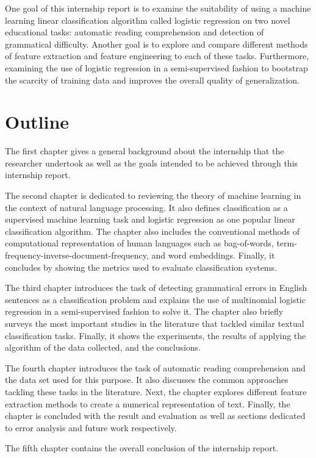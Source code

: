 One goal of this internship report is to examine the suitability of using a machine learning linear classification algorithm called logistic regression on two novel educational tasks: automatic reading comprehension and detection of grammatical difficulty. Another goal is to explore and compare different methods of feature extraction and feature engineering to each of these tasks. Furthermore, examining the use of logistic regression in a semi-supervised fashion to bootstrap the scarcity of training data and improves the overall quality of generalization. 


\section{Outline}
The first chapter gives a general background about the internship that the researcher undertook as well as the goals intended to be achieved through this internship report. 

The second chapter is dedicated to reviewing the theory of machine learning in the context of natural language processing. It also defines classification as a supervised machine learning task and logistic regression as one popular linear classification algorithm. The chapter also includes the conventional methods of computational representation of human languages such as bag-of-words, term-frequency-inverse-document-frequency, and word embeddings. Finally, it concludes by showing the metrics used to evaluate classification systems. 

The third chapter introduces the task of detecting grammatical errors in English sentences as a classification problem and explains the use of multinomial logistic regression in a semi-supervised fashion to solve it. The chapter also briefly surveys the most important studies in the literature that tackled similar textual
classification tasks. Finally, it shows the experiments, the results of
applying the algorithm of the data collected, and the conclusions. 

The fourth chapter introduces the task of automatic reading comprehension and the data set used for this purpose. It also discusses the common approaches tackling these tasks in the literature. Next, the chapter explores different feature extraction methods to create a numerical representation of text. Finally, the chapter is concluded with the result and evaluation as well as sections dedicated to error analysis and future work respectively. 

The fifth chapter contains the overall conclusion of the internship report.  

